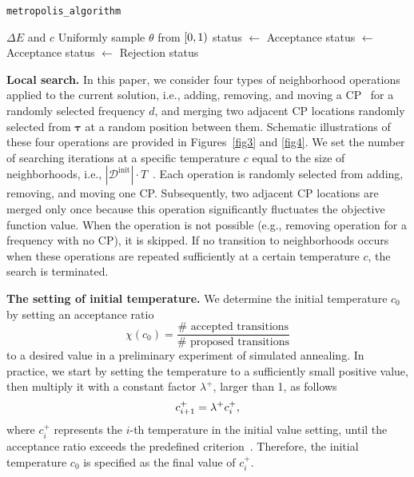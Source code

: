\begin{algorithm}[b] 
  \caption{\texttt{metropolis\_algorithm}}
  \label{alg_metro}
  \begin{algorithmic}[1]
    \REQUIRE $\Delta E$ and $c$
    \STATE Uniformly sample $\theta$ from $[0,1)$
      \STATE status $\leftarrow$ Acceptance
    \ELSE 
        \STATE status $\leftarrow$ Acceptance
      \ELSE
        \STATE status $\leftarrow$ Rejection
      \ENDIF 
    \ENDIF
    \ENSURE status
  \end{algorithmic}
\end{algorithm}

\textbf{Local search.}
% 
In this paper, we consider four types of neighborhood operations applied to the current solution, i.e., adding, removing, and moving a CP~\citep{lavielle1998optimal} for a randomly selected frequency $d$, 
and merging two adjacent CP locations randomly selected from $\bm{\tau}$ at a random position between them.
%
Schematic illustrations of these four operations are provided in Figures~\ref{fig3} and \ref{fig4}. 
%
We set the number of searching iterations at a specific temperature $c$ equal to the size of neighborhoods, i.e., $|\mathcal{D}^{\text{init}}| \cdot T$~\citep{aarts1989simulated}. 
%
Each operation is randomly selected from adding, removing, and moving one CP. 
%
Subsequently, two adjacent CP locations are merged only once because this operation significantly fluctuates the objective function value.
%
When the operation is not possible (e.g., removing operation for a frequency with no CP), it is skipped.
%
If no transition to neighborhoods occurs when these operations are repeated sufficiently at a certain temperature $c$, the search is terminated. 

\textbf{The setting of initial temperature.}
%
We determine the initial temperature $c_0$ by setting an acceptance ratio
\begin{equation}
 \chi (c_0) = \frac{\# \text{ accepted transitions}}{\# \text{ proposed transitions}} \label{acceptanceratio}
\end{equation}
to a desired value in a preliminary experiment of simulated annealing.
%
In practice, we start by setting the temperature to a sufficiently small positive value, then multiply it with a constant factor $\lambda^+$, larger than 1, as follows
\begin{equation}
 c_{i+1}^+ = \lambda^+ c_i^+, \notag
\end{equation}
where $c_i^+$ represents the $i$-th temperature in the initial value setting, until the acceptance ratio exceeds the predefined criterion~\citep{aarts1989simulated}.
%
Therefore, the initial temperature $c_0$ is specified as the final value of $c_i^+$.

